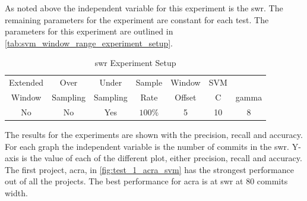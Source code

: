 
As noted above the independent variable for this experiment is the \gls{swr}. The remaining parameters for the experiment are constant for each test. The parameters for this experiment are outlined in \autoref{tab:svm_window_range_experiment_setup}.

\begin{table}[h]
\begin{center}

    \begin{tabular}{|c|c|c|c|c|cc|}
        \hline
        Extended & Over & Under & Sample & Window & SVM & \\
        Window & Sampling & Sampling & Rate & Offset & C & gamma \\ \hline
        No & No & Yes & $100\%$ & 5 & 10 & 8 \\ \hline
    \end{tabular}
    \caption{\gls{swr} Experiment Setup}
    \label{tab:svm_window_range_experiment_setup}
\end{center}

\end{table}

The results for the experiments are shown with the precision, recall and accuracy. For each graph the independent variable is the number of commits in the \gls{swr}. Y-axis is the value of each of the different plot, either precision, recall and accuracy. The first project, acra, in \autoref{fig:test_1_acra_svm} has the strongest performance out of all the projects. The best performance for acra is at \gls{swr} at 80 commits width.


